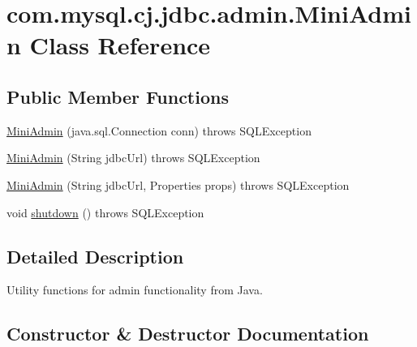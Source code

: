 \hypertarget{classcom_1_1mysql_1_1cj_1_1jdbc_1_1admin_1_1_mini_admin}{}\section{com.\+mysql.\+cj.\+jdbc.\+admin.\+Mini\+Admin Class Reference}
\label{classcom_1_1mysql_1_1cj_1_1jdbc_1_1admin_1_1_mini_admin}
\subsection*{Public Member Functions}
\begin{DoxyCompactItemize}
\item 
\mbox{\hyperlink{classcom_1_1mysql_1_1cj_1_1jdbc_1_1admin_1_1_mini_admin_a265501455d3447a946aaea75b1d435e7}{Mini\+Admin}} (java.\+sql.\+Connection conn)  throws S\+Q\+L\+Exception 
\item 
\mbox{\hyperlink{classcom_1_1mysql_1_1cj_1_1jdbc_1_1admin_1_1_mini_admin_a97a6c10c257dd29ed685e3486d478c65}{Mini\+Admin}} (String jdbc\+Url)  throws S\+Q\+L\+Exception 
\item 
\mbox{\hyperlink{classcom_1_1mysql_1_1cj_1_1jdbc_1_1admin_1_1_mini_admin_ad4c894eba2d8136133bd50d4a15db8ec}{Mini\+Admin}} (String jdbc\+Url, Properties props)  throws S\+Q\+L\+Exception 
\item 
void \mbox{\hyperlink{classcom_1_1mysql_1_1cj_1_1jdbc_1_1admin_1_1_mini_admin_af4e04df210876d8a537c5d699ba604fd}{shutdown}} ()  throws S\+Q\+L\+Exception 
\end{DoxyCompactItemize}


\subsection{Detailed Description}
Utility functions for admin functionality from Java. 

\subsection{Constructor \& Destructor Documentation}
\mbox{\label{classcom_1_1mysql_1_1cj_1_1jdbc_1_1admin_1_1_mini_admin_a265501455d3447a946aaea75b1d435e7}} 
